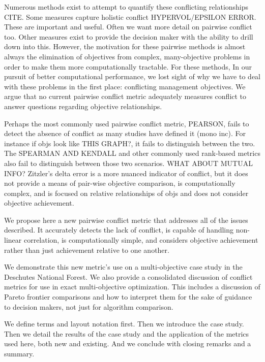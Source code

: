 Numerous methods exist to attempt to quantify these conflicting relationships CITE. Some measures capture holistic conflict HYPERVOL/EPSILON ERROR. These are important and useful. Often we want more detail on pairwise conflict too. Other measures exist to provide the decision maker with the ability to drill down into this. However, the motivation for these pairwise methods is almost always the elimination of objectives from complex, many-objective problems in order to make them more computationally tractable. For these methods, In our pursuit of better computational performance, we lost sight of why we have to deal with these problems in the first place: conflicting management objectives. We argue that no current pairwise conflict metric adequately measures conflict to answer questions regarding objective relationships.

Perhaps the most commonly used pairwise conflict metric, PEARSON, fails to detect the absence of conflict as many studies have defined it (mono inc). For instance if objs look like THIS GRAPH?, it fails to distinguish between the two. The SPEARMAN AND KENDALL and other commonly used rank-based metrics also fail to distinguish between those two scenarios. WHAT ABOUT MUTUAL INFO? Zitzler's delta error is a more nuanced indicator of conflict, but it does not provide a means of pair-wise objective comparison, is computationally complex, and is focused on relative relationships of objs and does not consider objective achievement.

We propose here a new pairwise conflict metric that addresses all of the issues described. It accurately detects the lack of conflict, is capable of handling non-linear correlation, is computationally simple, and considers objective achievement rather than just achievement relative to one another.

We demonstrate this new metric's use on a multi-objective case study in the Deschutes National Forest. We also provide a consolidated discussion of conflict metrics for use in exact multi-objective optimization. This includes a discussion of Pareto frontier comparisons and how to interpret them for the sake of guidance to decision makers, not just for algorithm comparison.

We define terms and layout notation first. Then we introduce the case study. Then we detail the results of the case study and the application of the metrics used here, both new and existing. And we conclude with closing remarks and a summary.